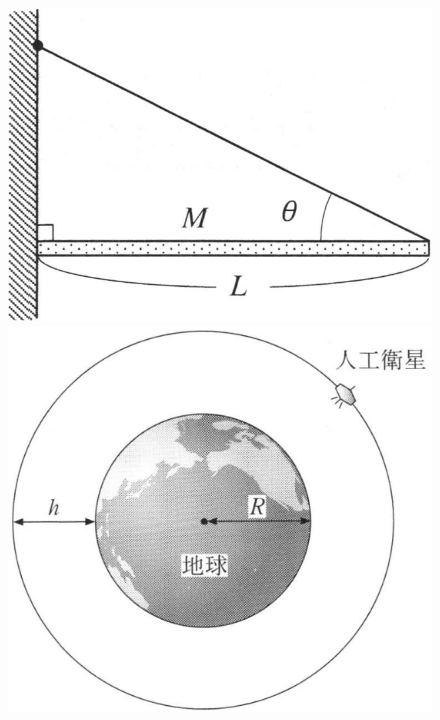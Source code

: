 \begin{figure}[H]
  \centering
  \begin{minipage}[b]{.3\columnwidth}
    \centering
    \includegraphics[width=\columnwidth]{../graphs/hamamatsu_23_2-1.png}
    \caption{}
  \end{minipage}
  \hspace{.1\columnwidth}
  \begin{minipage}[b]{.3\columnwidth}
    \centering
    \includegraphics[width=\columnwidth]{../graphs/hamamatsu_23_2-2.png}
    \caption{}
  \end{minipage}
\end{figure}

